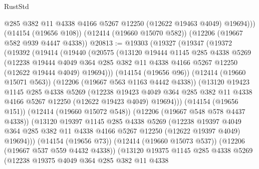 \begin{lexlean}{RustStd}
\begin{coremodule}
{\begin{coremodule}
{{{{{{{{{{{{{{{{{{{{{{{{{{{{{{{{{{{{{{{{{{{{{{{{{{          @285
          @382
          @11
          @4338
          @4166
          @5267
          @12250
          (@12622 @19463 @4049)
          @19694)))
    (@14154 (@19656 @108))
    (@12414 (@19660 @15070 @582))
    (@12206 (@19667 @582 @939 @4447 @4338))
@20813 := @19303
    (@19327
      (@19347
        (@19372
          (@19392
            (@19414
              (@19440
                (@20575
                  (@13120
                    @19444
                    @1145
                    @285
                    @4338
                    @5269
                    (@12238
                      @19444
                      @4049
                      @364
                      @285
                      @382
                      @11
                      @4338
                      @4166
                      @5267
                      @12250
                      (@12622 @19444 @4049)
                      @19694)))
                (@14154 (@19656 @96))
                (@12414 (@19660 @15071 @563))
                (@12206 (@19667 @563 @1163 @4442 @4338))
                (@13120
                  @19423
                  @1145
                  @285
                  @4338
                  @5269
                  (@12238
                    @19423
                    @4049
                    @364
                    @285
                    @382
                    @11
                    @4338
                    @4166
                    @5267
                    @12250
                    (@12622 @19423 @4049)
                    @19694)))
              (@14154 (@19656 @151))
              (@12414 (@19660 @15072 @548))
              (@12206 (@19667 @548 @578 @4437 @4338))
              (@13120
                @19397
                @1145
                @285
                @4338
                @5269
                (@12238
                  @19397
                  @4049
                  @364
                  @285
                  @382
                  @11
                  @4338
                  @4166
                  @5267
                  @12250
                  (@12622 @19397 @4049)
                  @19694)))
            (@14154 (@19656 @73))
            (@12414 (@19660 @15073 @537))
            (@12206 (@19667 @537 @559 @4432 @4338))
            (@13120
              @19375
              @1145
              @285
              @4338
              @5269
              (@12238
                @19375
                @4049
                @364
                @285
                @382
                @11
                @4338
}}}}}}}}}}}}}}}}}}}}}}}}}}}}}}}}}}}}}}}}}}}}}}}}}}
\end{coremodule}}
\end{coremodule}
\end{lexlean}
